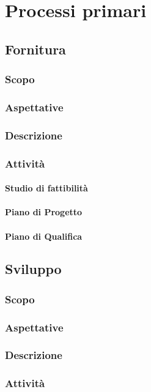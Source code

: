 \section{Processi primari}

\subsection{Fornitura}

	\subsubsection{Scopo}
	\subsubsection{Aspettative}
	\subsubsection{Descrizione}
	\subsubsection{Attività}
		\paragraph{Studio di fattibilità}
		\paragraph{Piano di Progetto}
		\paragraph{Piano di Qualifica}
	
\subsection{Sviluppo}
	\subsubsection{Scopo}
	\subsubsection{Aspettative}
	\subsubsection{Descrizione}
	\subsubsection{Attività}
